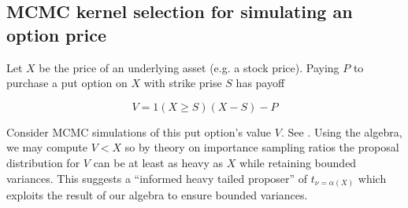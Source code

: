 \documentclass{article}
\theoremstyle{definition}
\begin{document}
{\subsection{MCMC kernel selection for simulating an option price}

Let $X$ be the price of an underlying asset (e.g. a stock price). Paying $P$ to purchase a put option on $X$ with strike prise $S$ has payoff

$$V = 1(X \geq S) (X - S) - P$$

Consider MCMC simulations of this put option's value $V$. See .
Using the algebra, we may compute $V < X$ so by theory on importance sampling ratios
the proposal distribution for $V$ can be at least as heavy as $X$ while retaining bounded
variances. This suggests a ``informed heavy tailed proposer'' of $t_{\nu=\alpha(X)}$ which
exploits the result of our algebra to ensure bounded variances.

}
\end{document}
